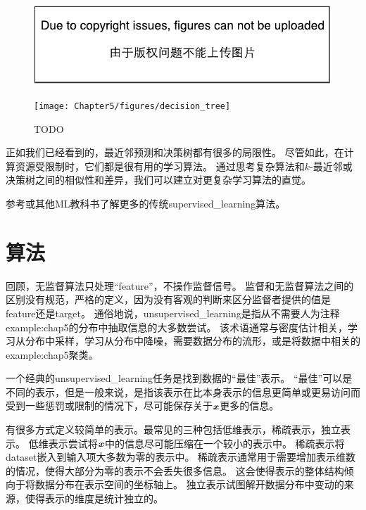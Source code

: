 \begin{figure}[!htb]
\ifOpenSource
\centerline{\includegraphics{figure.pdf}}
\else
\centerline{\texttt{[image: Chapter5/figures/decision\_tree]}}
\fi
\caption{TODO}
\label{fig:chap5_decision_tree}
\end{figure}

正如我们已经看到的，最近邻预测和决策树都有很多的局限性。
尽管如此，在计算资源受限制时，它们都是很有用的学习算法。
通过思考复杂算法和$k$-最近邻或决策树之间的相似性和差异，我们可以建立对更复杂学习算法的直觉。

参考\cite{MurphyBook2012,bishop-book2006,Hastie2001}或其他\gls{ML}教科书了解更多的传统\gls{supervised_learning}算法。

\section{算法}
\label{sec:unsupervised_learning_algorithms}
回顾，无监督算法只处理``\gls{feature}''，不操作监督信号。
监督和无监督算法之间的区别没有规范，严格的定义，因为没有客观的判断来区分监督者提供的值是\gls{feature}还是\gls{target}。
通俗地说，\gls{unsupervised_learning}是指从不需要人为注释\gls{example:chap5}的分布中抽取信息的大多数尝试。
该术语通常与密度估计相关，学习从分布中采样，学习从分布中降噪，需要数据分布的流形，或是将数据中相关的\gls{example:chap5}聚类。

一个经典的\gls{unsupervised_learning}任务是找到数据的``最佳''表示。
``最佳''可以是不同的表示，但是一般来说，是指该表示在比本身表示的信息更简单或更易访问而受到一些惩罚或限制的情况下，尽可能保存关于$\boldsymbol{\mathit{x}}$更多的信息。 


有很多方式定义较简单的表示。最常见的三种包括低维表示，稀疏表示，独立表示。
低维表示尝试将$\boldsymbol{\mathit{x}}$中的信息尽可能压缩在一个较小的表示中。
稀疏表示将\gls{dataset}嵌入到输入项大多数为零的表示中\citep{Barlow89,Olshausen+Field-1996,Hinton+Ghahramani-97}。
稀疏表示通常用于需要增加表示维数的情况，使得大部分为零的表示不会丢失很多信息。
这会使得表示的整体结构倾向于将数据分布在表示空间的坐标轴上。
独立表示试图解开数据分布中变动的来源，使得表示的维度是统计独立的。

